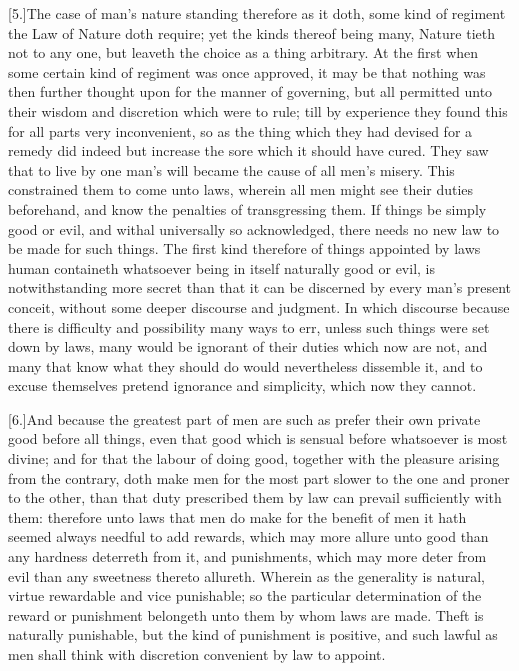 [5.]The case of man’s nature standing therefore as it doth, some kind of regiment the Law of Nature doth require; yet the kinds thereof being many, Nature tieth not to any one, but leaveth the choice as a thing arbitrary. At the first when some certain kind of regiment was once approved, it may be that nothing was then further thought upon for the manner of governing, but all permitted unto their wisdom and discretion which were to rule; till by experience they found this for all parts very inconvenient, so as the thing which they had devised for a remedy did indeed but increase the sore which it should have cured. They saw that to live by one man’s will became the cause of all men’s misery. This constrained  them to come unto laws, wherein all men might see their duties beforehand, and know the penalties of transgressing them. If things be simply good or evil, and withal universally so acknowledged, there needs no new law to be made for such things. The first kind therefore of things appointed by laws human containeth whatsoever being in itself naturally good or evil, is notwithstanding more secret than that it can be discerned by every man’s present conceit, without some deeper discourse and judgment. In which discourse because there is difficulty and possibility many ways to err, unless such things were set down by laws, many would be ignorant of their duties which now are not, and many that know what they should do would nevertheless dissemble it, and to excuse themselves pretend ignorance and simplicity, which now they cannot.

[6.]And because the greatest part of men are such as prefer their own private good before all things, even that good which is sensual before whatsoever is most divine; and for that the labour of doing good, together with the pleasure arising from the contrary, doth make men for the most part slower to the one and proner to the other, than that duty prescribed them by law can prevail sufficiently with them: therefore unto laws that men do make for the benefit of men it hath seemed always needful to add rewards, which may more allure unto good than any hardness deterreth from it, and punishments, which may more deter from evil than any sweetness thereto allureth. Wherein as the generality is natural, virtue rewardable and vice punishable; so the particular determination of the reward or punishment belongeth unto them by whom laws are made. Theft is naturally punishable, but the kind of punishment is positive, and such lawful as men shall think with discretion convenient by law to appoint.

